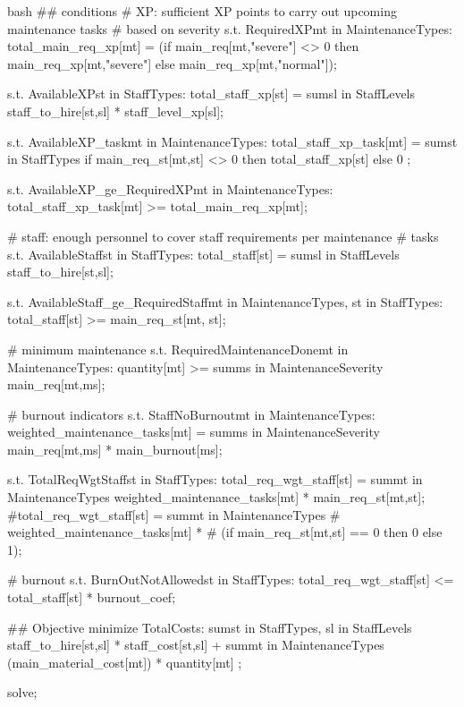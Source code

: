     \newline
    \newpage
    \vspace{2pt}
    \begin{boxminted}{bash}
        ## conditions
        # XP: sufficient XP points to carry out upcoming maintenance tasks 
        # based on severity
        s.t. RequiredXP{mt in MaintenanceTypes}: 
            total_main_req_xp[mt] = (if main_req[mt,"severe"] <> 0 then 
                                        main_req_xp[mt,"severe"] 
                                        else main_req_xp[mt,"normal"]);
        
        s.t. AvailableXP{st in StaffTypes}:
            total_staff_xp[st] = sum{sl in StaffLevels} staff_to_hire[st,sl] * 
                                    staff_level_xp[sl];
        
        s.t. AvailableXP_task{mt in MaintenanceTypes}:
            total_staff_xp_task[mt] = sum{st in StaffTypes} 
                                        if main_req_st[mt,st] <> 0 then 
                                        total_staff_xp[st] else 0 ;
            
        s.t. AvailableXP_ge_RequiredXP{mt in MaintenanceTypes}:
            total_staff_xp_task[mt] >= total_main_req_xp[mt];
        
        # staff: enough personnel to cover staff requirements per maintenance 
        # tasks	
        s.t. AvailableStaff{st in StaffTypes}:
            total_staff[st] = sum{sl in StaffLevels} staff_to_hire[st,sl];
            
        s.t. AvailableStaff_ge_RequiredStaff{mt in MaintenanceTypes, 
        st in StaffTypes}:
            total_staff[st] >= main_req_st[mt, st];
        
        # minimum maintenance
        s.t. RequiredMaintenanceDone{mt in MaintenanceTypes}: 
            quantity[mt] >= sum{ms in MaintenanceSeverity} main_req[mt,ms];
        
        # burnout indicators
        s.t. StaffNoBurnout{mt in MaintenanceTypes}:
            weighted_maintenance_tasks[mt] = sum{ms in MaintenanceSeverity} 
                main_req[mt,ms] * main_burnout[ms];
        
        s.t. TotalReqWgtStaff{st in StaffTypes}:
            total_req_wgt_staff[st] = sum{mt in MaintenanceTypes} 
                weighted_maintenance_tasks[mt] * main_req_st[mt,st];
            #total_req_wgt_staff[st] = sum{mt in MaintenanceTypes} 
                # weighted_maintenance_tasks[mt] * 
                # (if main_req_st[mt,st] == 0 then 0 else 1);
        
        # burnout
        s.t. BurnOutNotAllowed{st in StaffTypes}:
            total_req_wgt_staff[st] <= total_staff[st] * burnout_coef;
        
        ## Objective
        minimize TotalCosts: 
            sum{st in StaffTypes, sl in StaffLevels} staff_to_hire[st,sl] * 
                staff_cost[st,sl] +
            sum{mt in MaintenanceTypes} (main_material_cost[mt]) * 
                quantity[mt] ;
        
        solve;
        
    \end{boxminted}
